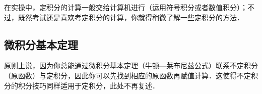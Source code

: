 
在实操中，定积分的计算一般交给计算机进行（运用符号积分或者数值积分）；不过，既然考试还是喜欢考定积分的计算，你就得稍微了解一些定积分的方法．

\subsection{微积分基本定理}
原则上说，因为你总能通过微积分基本定理（牛顿—莱布尼兹公式）联系不定积分（原函数）与定积分，因此你可以先找到相应的原函数再赋值计算．这使得不定积分的积分技巧同样适用于定积分，此处不再复述．
